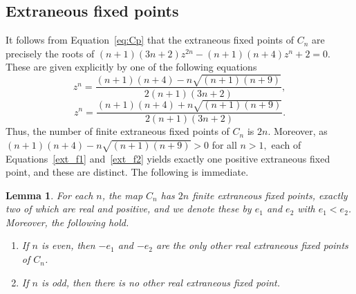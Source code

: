 \documentclass[12pt]{article}
\newtheorem{lem}{Lemma}[section]
\begin{document}
\subsection{Extraneous fixed points}
 It follows from Equation~\eqref{eq:Cp} that the extraneous fixed points of $C_n$ are precisely the roots of  $(n+1)(3n+2)z^{2n}-(n+1)(n+4)z^n+2=0.$ These are given explicitly by one of the following equations
	\begin{equation}\label{ext_f1}
		z^n=\frac{(n+1)(n+4)- n \sqrt{(n+1)(n+9)}}{2(n+1)(3n+2)},
	\end{equation}
	\begin{equation}\label{ext_f2}
		z^n=\frac{(n+1)(n+4)+ n \sqrt{(n+1)(n+9)}}{2(n+1)(3n+2)}.
	\end{equation}
Thus, the number of finite extraneous fixed points of $C_n$ is $2n$. Moreover, as $(n+1)(n+4) - n \sqrt{(n+1)(n+9)} > 0$ for all $n > 1,$ each of  Equations~\eqref{ext_f1} and~\eqref{ext_f2} yields exactly one positive extraneous fixed point, and these are distinct. The following is immediate.

\begin{lem}
	For each $n$, the map $C_n$ has $2n$ finite extraneous fixed points, exactly two of which are real and positive, and we denote these by $e_1$ and $e_2$ with $e_1 < e_2$. Moreover, the following hold.
	\begin{enumerate}
		\item If $n$ is even, then $-e_1$ and $-e_2$ are the only other real extraneous fixed points of $C_n$.
		\item If $n$ is odd, then there is no other real extraneous fixed point.
	\end{enumerate}
	\label{extraneous-general}
\end{lem}
\end{document}
